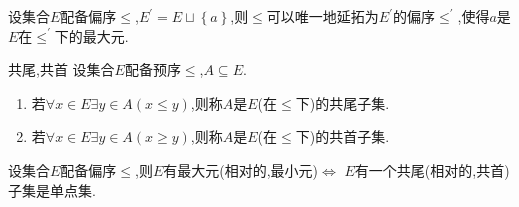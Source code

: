 \begin{proposition}{}{}
	设集合$E$配备偏序$\leq$,$E^{\prime}=E\sqcup\left\{a\right\}$,则$\leq$可以唯一地延拓为$E^{\prime}$的偏序$\leq^{\prime}$,使得$a$是$E$在$\leq^{\prime}$下的最大元.
\end{proposition}

\begin{definition}{共尾,共首}{}
	设集合$E$配备预序$\leq$,$A\subseteq E$.
	\begin{enumerate}
		\item 若$\forall x\in E\exists y\in A\left(x\leq y\right)$,则称$A$是$E$(在$\leq$下)的共尾子集.
		\item 若$\forall x\in E\exists y\in A\left(x\geq y\right)$,则称$A$是$E$(在$\leq$下)的共首子集.
	\end{enumerate}
\end{definition}

\begin{proposition}{}{}
	设集合$E$配备偏序$\leq$,则$E$有最大元(相对的,最小元)$\iff$ $E$有一个共尾(相对的,共首)子集是单点集.
\end{proposition}
































































